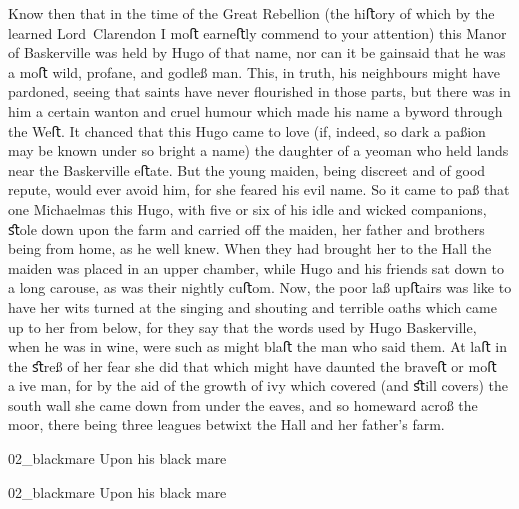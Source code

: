 \begin{withoutfootnotes}
Know then that in the time of the Great Rebellion (the hiﬅory of which by the learned Lord~Clarendon I moﬅ earneﬅly commend to your attention) this Manor of Baskerville was held by Hugo of that name, nor can it be gainsaid that he was a moﬅ wild, profane, and godleß man. This, in truth, his neighbours might have pardoned, seeing that saints have never ﬂourished in those parts, but there was in him a certain wanton and cruel humour which made his name a byword through the Weﬅ. It chanced that this Hugo came to love (if, indeed, so dark a paßion may be known under so bright a name) the daughter of a yeoman who held lands near the Baskerville eﬅate. But the young maiden, being discreet and of good repute, would ever avoid him, for she feared his evil name. So it came to paß that one Michaelmas this Hugo, with ﬁve or six of his idle and wicked companions, ﬆole down upon the farm and carried oﬀ the maiden, her father and brothers being from home, as he well knew. When they had brought her to the Hall the maiden was placed in an upper chamber, while Hugo and his friends sat down to a long carouse, as was their nightly cuﬅom. Now, the poor laß upﬅairs was like to have her wits turned at the singing and shouting and terrible oaths which came up to her from below, for they say that the words used by Hugo Baskerville, when he was in wine, were such as might blaﬅ the man who said them. At laﬅ in the ﬆreß of her fear she did that which might have daunted the braveﬅ or moﬅ aive man, for by the aid of the growth of ivy which covered (and ﬆill covers) the south wall she came down from under the eaves, and so homeward acroß the moor, there being three leagues betwixt the Hall and her father's farm.
\end{withoutfootnotes}

\begin{letter}
	\begin{bwbigpic}
			[1.0]  
		{02_blackmare}
		{Upon his black mare}
	\end{bwbigpic}
\end{letter}
\begin{a4}
	\begin{bwbigpic}
			[1.0] 
		{02_blackmare}
		{Upon his black mare}
	\end{bwbigpic}
\end{a4}

